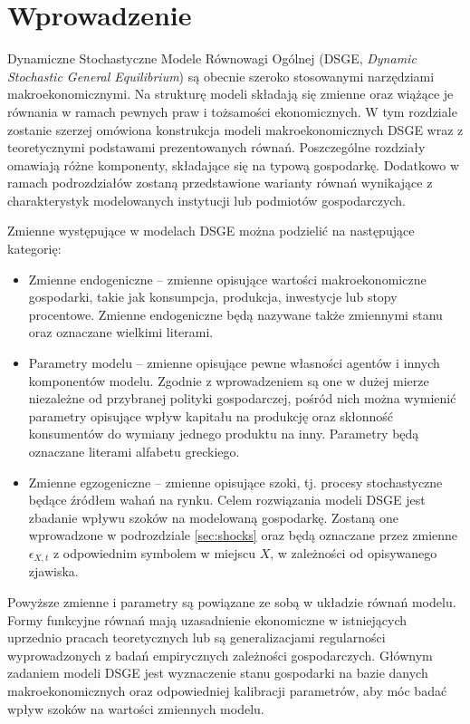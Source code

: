 \section{Wprowadzenie}
\label{sec:models_intro}

Dynamiczne Stochastyczne Modele Równowagi Ogólnej (DSGE, \emph{Dynamic Stochastic General Equilibrium}) są obecnie szeroko stosowanymi narzędziami makroekonomicznymi. Na strukturę modeli składają się zmienne oraz wiążące je równania w ramach pewnych praw i tożsamości ekonomicznych. W tym rozdziale zostanie szerzej omówiona konstrukcja modeli makroekonomicznych DSGE wraz z teoretycznymi podstawami prezentowanych równań. Poszczególne rozdziały omawiają różne komponenty, składające się na typową gospodarkę. Dodatkowo w ramach podrozdziałów zostaną przedstawione warianty równań wynikające z charakterystyk modelowanych instytucji lub podmiotów gospodarczych.

Zmienne występujące w modelach DSGE można podzielić na następujące kategorię:
\begin{itemize}
    \item Zmienne endogeniczne -- zmienne opisujące wartości makroekonomiczne gospodarki, takie jak konsumpcja, produkcja, inwestycje lub stopy procentowe. Zmienne endogeniczne będą nazywane także zmiennymi stanu oraz oznaczane wielkimi literami.
    \item Parametry modelu -- zmienne opisujące pewne własności agentów i innych komponentów modelu. Zgodnie z wprowadzeniem są one w dużej mierze niezależne od przybranej polityki gospodarczej, pośród nich można wymienić parametry opisujące wpływ kapitału na produkcję oraz skłonność konsumentów do wymiany jednego produktu na inny. Parametry będą oznaczane literami alfabetu greckiego.
    \item Zmienne egzogeniczne -- zmienne opisujące szoki, tj. procesy stochastyczne będące źródłem wahań na rynku. Celem rozwiązania modeli DSGE jest zbadanie wpływu szoków na modelowaną gospodarkę. Zostaną one wprowadzone w podrozdziale \ref{sec:shocks} oraz będą oznaczane przez zmienne $\epsilon_{X, t}$ z odpowiednim symbolem w miejscu $X$, w zależności od opisywanego zjawiska.
\end{itemize}

Powyższe zmienne i parametry są powiązane ze sobą w układzie równań modelu. Formy funkcyjne równań mają uzasadnienie ekonomiczne w istniejących uprzednio pracach teoretycznych lub są generalizacjami regularności wyprowadzonych z badań empirycznych zależności gospodarczych. Głównym zadaniem modeli DSGE jest wyznaczenie stanu gospodarki na bazie danych makroekonomicznych oraz odpowiedniej kalibracji parametrów, aby móc badać wpływ szoków na wartości zmiennych modelu.

